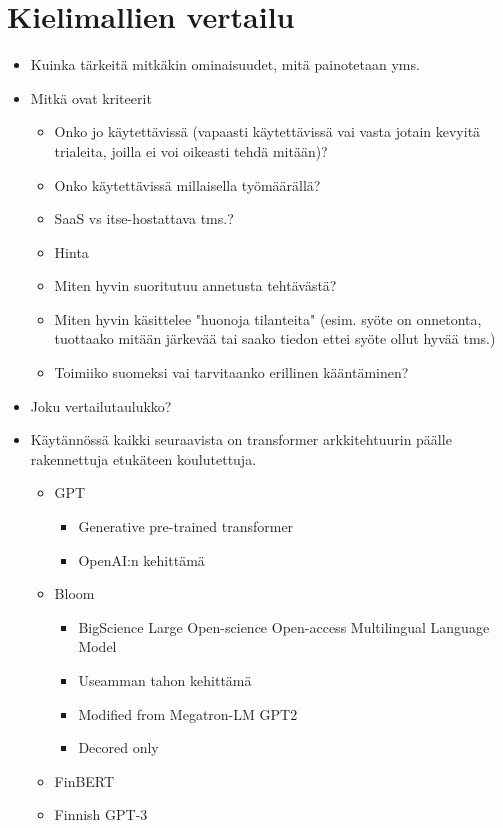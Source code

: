 \chapter{Kielimallien vertailu}%
\label{ch:vertailu}

\begin{itemize}
  \item Kuinka tärkeitä mitkäkin ominaisuudet, mitä painotetaan yms.
  \item Mitkä ovat kriteerit
  \begin{itemize}
    \item Onko jo käytettävissä (vapaasti käytettävissä vai vasta jotain kevyitä trialeita, joilla ei voi oikeasti tehdä mitään)?
    \item Onko käytettävissä millaisella työmäärällä?
    \item SaaS vs itse-hostattava tms.?
    \item Hinta
    \item Miten hyvin suoritutuu annetusta tehtävästä?
    \item Miten hyvin käsittelee "huonoja tilanteita" (esim. syöte on onnetonta, tuottaako mitään järkevää tai saako tiedon ettei syöte ollut hyvää tms.)
    \item Toimiiko suomeksi vai tarvitaanko erillinen kääntäminen?
  \end{itemize}
  \item Joku vertailutaulukko?
  \item  Käytännössä kaikki seuraavista on transformer arkkitehtuurin päälle rakennettuja etukäteen koulutettuja.
  \begin{itemize}
    \item GPT
    \begin{itemize}
      \item Generative pre-trained transformer
      \item OpenAI:n kehittämä
    \end{itemize}
    \item Bloom
    \begin{itemize}
      \item BigScience Large Open-science Open-access Multilingual Language Model
      \item Useamman tahon kehittämä
      \item Modified from Megatron-LM GPT2
      \item Decored only
    \end{itemize}
    \item FinBERT
    \item Finnish GPT-3

\end{itemize}
\end{itemize}
